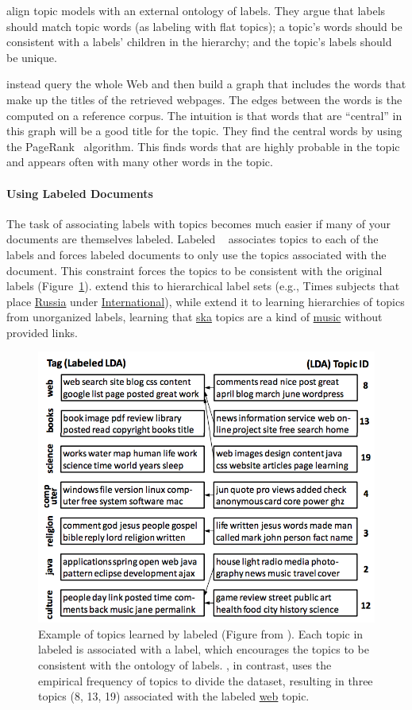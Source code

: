 \citet{mao-12} align topic models with an external ontology of labels.
They argue that labels should match topic words (as labeling with flat
topics); a topic's words should be consistent with a labels' children
in the hierarchy; and the topic's labels should be unique.

\citet{aleteras-14} instead query the whole Web and then build a graph that
includes the words that make up the titles of the retrieved webpages. The edges
between the words is the  computed on a reference corpus.  The
intuition is that words that are ``central'' in this graph will be a good title
for the topic.  They find the central words by using the PageRank~\citep{page-99}
algorithm.  This finds words that are highly probable in the topic and appears
often with many other words in the topic.

\paragraph{Using Labeled Documents}

The task of associating labels with topics becomes much easier if many of your
documents are themselves labeled.  Labeled ~\citep{ramage-09}
associates topics to each of the labels and forces labeled documents to only use
the topics associated with the document.  This constraint forces the topics to
be consistent with the original labels (Figure~\ref{fig:llda}).
\citet{Bakalov-12} extend this to hierarchical label sets (e.g.,  Times
subjects that place \underline{Russia} under \underline{International}), while
\citet{nguyen:boyd-graber:resnik:chang-2014} extend it to learning hierarchies
of topics from unorganized labels, learning that \underline{ska} topics are a
kind of \underline{music} without provided links.

\begin{figure}
  \begin{center}
    \includegraphics[width=.5\linewidth]{figures/viz_llda}
  \end{center}
  \caption{Example of topics learned by labeled  (Figure from
    \citet{ramage-09}).  Each topic in labeled  is associated with a
    label, which encourages the topics to be consistent with the ontology of
    labels.  , in contrast, uses the empirical frequency of topics to
    divide the dataset, resulting in three topics (8, 13, 19) associated with
    the labeled  \underline{web} topic. }
  \label{fig:llda}
\end{figure}


